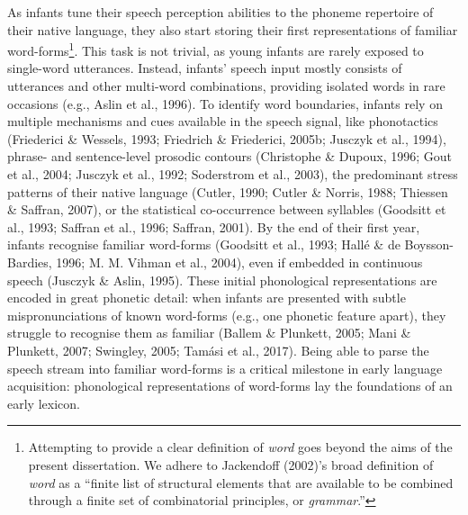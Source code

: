 \documentclass[
  12pt,
  b5paperpaper,
  twoside]{scrreprt}
\begin{document}
As infants tune their speech perception abilities to the phoneme
repertoire of their native language, they also start storing their first
representations of familiar word-forms\footnote{Attempting to provide a
  clear definition of \emph{word} goes beyond the aims of the present
  dissertation. We adhere to Jackendoff (2002)'s broad definition of
  \emph{word} as a ``finite list of structural elements that are
  available to be combined through a finite set of combinatorial
  principles, or \emph{grammar}.''}. This task is not trivial, as young
infants are rarely exposed to single-word utterances. Instead, infants'
speech input mostly consists of utterances and other multi-word
combinations, providing isolated words in rare occasions (e.g., Aslin et
al., 1996). To identify word boundaries, infants rely on multiple
mechanisms and cues available in the speech signal, like phonotactics
(Friederici \& Wessels, 1993; Friedrich \& Friederici, 2005b; Jusczyk et
al., 1994), phrase- and sentence-level prosodic contours (Christophe \&
Dupoux, 1996; Gout et al., 2004; Jusczyk et al., 1992; Soderstrom et
al., 2003), the predominant stress patterns of their native language
(Cutler, 1990; Cutler \& Norris, 1988; Thiessen \& Saffran, 2007), or
the statistical co-occurrence between syllables (Goodsitt et al., 1993;
Saffran et al., 1996; Saffran, 2001). By the end of their first year,
infants recognise familiar word-forms (Goodsitt et al., 1993; Hallé \&
de Boysson-Bardies, 1996; M. M. Vihman et al., 2004), even if embedded
in continuous speech (Jusczyk \& Aslin, 1995). These initial
phonological representations are encoded in great phonetic detail: when
infants are presented with subtle mispronunciations of known word-forms
(e.g., one phonetic feature apart), they struggle to recognise them as
familiar (Ballem \& Plunkett, 2005; Mani \& Plunkett, 2007; Swingley,
2005; Tamási et al., 2017). Being able to parse the speech stream into
familiar word-forms is a critical milestone in early language
acquisition: phonological representations of word-forms lay the
foundations of an early lexicon.
\end{document}
